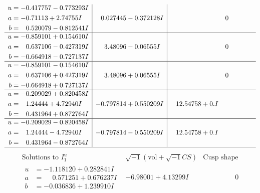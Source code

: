 \documentclass[1p]{elsarticle_modified}
\theoremstyle{definition}
\newcommand{\I}{\sqrt{-1}}
\begin{document}
$$\begin{array}{c|c|c}
\begin{aligned}
u &= -0.417757 - 0.773293 I \\
a &= -0.71113 + 2.74755 I \\
b &= \phantom{-}0.520079 - 0.812541 I\end{aligned}
 & \phantom{-}0.027445 - 0.372128 I & \phantom{-0.000000 } 0 \\ \hline\begin{aligned}
u &= -0.859101 + 0.154610 I \\
a &= \phantom{-}0.637106 - 0.427319 I \\
b &= -0.664918 - 0.727137 I\end{aligned}
 & \phantom{-}3.48096 - 0.06555 I & \phantom{-0.000000 } 0 \\ \hline\begin{aligned}
u &= -0.859101 - 0.154610 I \\
a &= \phantom{-}0.637106 + 0.427319 I \\
b &= -0.664918 + 0.727137 I\end{aligned}
 & \phantom{-}3.48096 + 0.06555 I & \phantom{-0.000000 } 0 \\ \hline\begin{aligned}
u &= -0.209029 + 0.820458 I \\
a &= \phantom{-}1.24444 + 4.72940 I \\
b &= \phantom{-}0.431964 + 0.872764 I\end{aligned}
 & -0.797814 + 0.550209 I & \phantom{-}12.54758 + 0. I\phantom{ +0.000000I} \\ \hline\begin{aligned}
u &= -0.209029 - 0.820458 I \\
a &= \phantom{-}1.24444 - 4.72940 I \\
b &= \phantom{-}0.431964 - 0.872764 I\end{aligned}
 & -0.797814 - 0.550209 I & \phantom{-}12.54758 + 0. I\phantom{ +0.000000I}\\
 \hline 
 \end{array}$$\newpage$$\begin{array}{c|c|c}  
\text{Solutions to }I^u_{1}& \I (\text{vol} + \sqrt{-1}CS) & \text{Cusp shape}\\
 \hline 
\begin{aligned}
u &= -1.118120 + 0.282841 I \\
a &= \phantom{-}0.571251 + 0.676237 I \\
b &= -0.036836 + 1.239910 I\end{aligned}
 & -6.98001 + 4.13299 I & \phantom{-0.000000 } 0 \\ \hline\begin{aligned}

\end{aligned}
\end{array}$$
\end{document}
